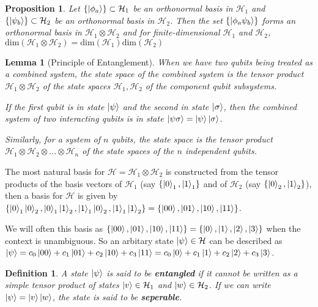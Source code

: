 \documentclass[12pt,twoside]{report}
\theoremstyle{thmstyle}
\newtheorem{defn}[subsection]{Definition}
\newtheorem{lemma}[subsection]{Lemma}
\newtheorem{prop}[subsection]{Proposition}
\begin{document}
\begin{prop}
    Let $\{ \ket{\phi_a} \} \subset \mathcal{H}_1$ be an orthonormal basis in $\mathcal{H}_1$ and $\{ \ket{\psi_b} \} \subset \mathcal{H}_2$ be an orthonormal basis in $\mathcal{H}_2$. Then the set $\{ \ket{\phi_a\psi_b} \}$ forms an orthonormal basis in $\mathcal{H}_1 \otimes \mathcal{H}_2$ and for finite-dimensional $\mathcal{H}_1$ and $\mathcal{H}_2$, $\text{dim}(\mathcal{H}_1 \otimes \mathcal{H}_2) = \text{dim}(\mathcal{H}_1) \text{dim}(\mathcal{H}_2)$
\end{prop}

\begin{lemma}[Principle of Entanglement]
When we have two qubits being treated as a combined system, the state space of the combined system is the tensor product $\mathcal{H}_1 \otimes \mathcal{H}_2$ of the state spaces $\mathcal{H}_1, \mathcal{H}_2$ of the component qubit subsystems. 

    \vspace{0.2cm}
If the first qubit is in state $\ket{\psi}$ and the second in state $\ket{\sigma}$, then the combined system of two interacting qubits is in state $\ket{\psi\sigma} = \ket{\psi}\ket{\sigma}$.

    \vspace{0.2cm}
Similarly, for a system of $n$ qubits, the state space is the tensor product $\mathcal{H}_1 \otimes \mathcal{H}_2 \otimes ... \otimes \mathcal{H}_n$ of the state spaces of the $n$ independent qubits.
\end{lemma}

The most natural basis for $\mathcal{H} = \mathcal{H}_1 \otimes \mathcal{H}_2$ is constructed from the tensor products of the basis vectors of $\mathcal{H}_1$ (say $\{ \ket{0}_1, \ket{1}_1 \}$ and of $\mathcal{H}_2$ (say $\{ \ket{0}_2, \ket{1}_2 \}$), then a basis for $\mathcal{H}$ is given by $\{ \ket{0}_1\ket{0}_2, \ket{0}_1\ket{1}_2, \ket{1}_1\ket{0}_2, \ket{1}_1\ket{1}_2 \} \\ = \{ \ket{00}, \ket{01}, \ket{10}, \ket{11} \}$.

We will often this basis as $\{ \ket{00}, \ket{01}, \ket{10}, \ket{11} \} = \{ \ket{0}, \ket{1}, \ket{2}, \ket{3} \}$ when the context is unambiguous. So an arbitary state $\ket{\psi} \in \mathcal{H}$ can be described as $\ket{\psi} = c_0 \ket{00} + c_1 \ket{01} + c_2 \ket{10} + c_3 \ket{11} = c_0 \ket{0} + c_1 \ket{1} + c_2 \ket{2} + c_3 \ket{3}$.

\begin{defn}
A state $\ket{\psi}$ is said to be \textbf{entangled} if it cannot be written as a simple tensor product of states $\ket{v} \in \mathcal{H}_1$ and $\ket{w} \in \mathcal{H}_2$. If we can write $\ket{\psi} = \ket{v}\ket{w}$, the state is said to be \textbf{seperable}.
\end{defn}
\end{document}
